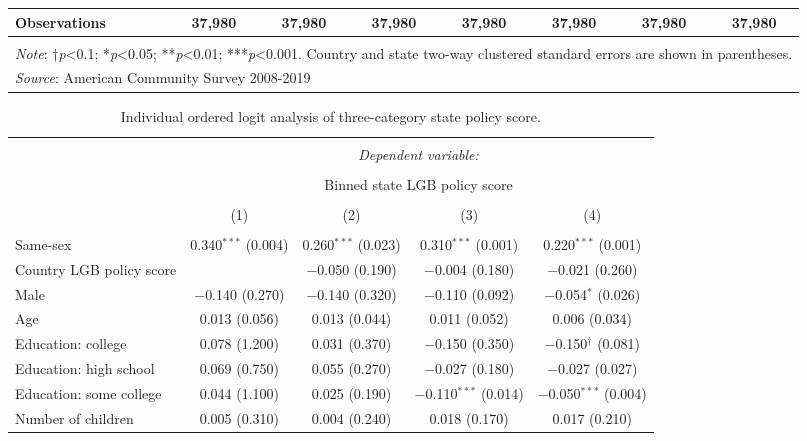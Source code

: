 \documentclass[
  11pt,
]{article}
\begin{document}
\begin{table}[H]
\begin{tabular}{@{\extracolsep{2pt}}lccccccc}
Observations & 37,980 & 37,980 & 37,980 & 37,980 & 37,980 & 37,980 & 37,980 \\ 
\hline 
\hline \\[-1.8ex] 
\multicolumn{8}{l}{\parbox[t]{\textwidth}{\textit{Note}: †\textit{p}<0.1; *\textit{p}<0.05; **\textit{p}<0.01; ***\textit{p}<0.001. Country and state two-way clustered standard errors are shown in parentheses.}} \\ 
\multicolumn{8}{l}{\textit{Source}: American Community Survey 2008-2019} \\ 
\end{tabular} 
\end{table}

\begin{table}[H] \centering 
  \caption{Individual ordered logit analysis of three-category state policy score.} 
  \label{tab:ord-full} 
\footnotesize 
\begin{tabular}{@{\extracolsep{5pt}}lcccc} 
\\[-1.8ex]\hline 
\hline \\[-1.8ex] 
 & \multicolumn{4}{c}{\textit{Dependent variable:}} \\ 
\cline{2-5} 
\\[-1.8ex] & \multicolumn{4}{c}{Binned state LGB policy score} \\ 
\\[-1.8ex] & (1) & (2) & (3) & (4)\\ 
\hline \\[-1.8ex] 
 Same-sex & 0.340$^{***}$ (0.004) & 0.260$^{***}$ (0.023) & 0.310$^{***}$ (0.001) & 0.220$^{***}$ (0.001) \\ 
  Country LGB policy score &  & $-$0.050 (0.190) & $-$0.004 (0.180) & $-$0.021 (0.260) \\ 
  Male & $-$0.140 (0.270) & $-$0.140 (0.320) & $-$0.110 (0.092) & $-$0.054$^{*}$ (0.026) \\ 
  Age & 0.013 (0.056) & 0.013 (0.044) & 0.011 (0.052) & 0.006 (0.034) \\ 
  Education: college & 0.078 (1.200) & 0.031 (0.370) & $-$0.150 (0.350) & $-$0.150$^{†}$ (0.081) \\ 
  Education: high school & 0.069 (0.750) & 0.055 (0.270) & $-$0.027 (0.180) & $-$0.027 (0.027) \\ 
  Education: some college & 0.044 (1.100) & 0.025 (0.190) & $-$0.110$^{***}$ (0.014) & $-$0.050$^{***}$ (0.004) \\ 
  Number of children & 0.005 (0.310) & 0.004 (0.240) & 0.018 (0.170) & 0.017 (0.210) \\ 

\end{tabular}
\end{table}
\end{document}
